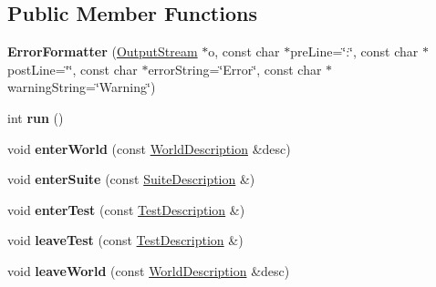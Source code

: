 \subsection*{Public Member Functions}
\begin{DoxyCompactItemize}
\item 
\hypertarget{classCxxTest_1_1ErrorFormatter_a9a6363f7a4b3aca6cdaeb6111826e7de}{{\bfseries Error\-Formatter} (\hyperlink{classCxxTest_1_1OutputStream}{Output\-Stream} $\ast$o, const char $\ast$pre\-Line=\char`\"{}\-:\char`\"{}, const char $\ast$post\-Line=\char`\"{}\char`\"{}, const char $\ast$error\-String=\char`\"{}Error\char`\"{}, const char $\ast$warning\-String=\char`\"{}Warning\char`\"{})}\label{classCxxTest_1_1ErrorFormatter_a9a6363f7a4b3aca6cdaeb6111826e7de}

\item 
\hypertarget{classCxxTest_1_1ErrorFormatter_a864e271c4a95907866d483a460aa5f71}{int {\bfseries run} ()}\label{classCxxTest_1_1ErrorFormatter_a864e271c4a95907866d483a460aa5f71}

\item 
\hypertarget{classCxxTest_1_1ErrorFormatter_aadd286f416ba8cf6df836863e7a44884}{void {\bfseries enter\-World} (const \hyperlink{classCxxTest_1_1WorldDescription}{World\-Description} \&desc)}\label{classCxxTest_1_1ErrorFormatter_aadd286f416ba8cf6df836863e7a44884}

\item 
\hypertarget{classCxxTest_1_1ErrorFormatter_a72d81800df02cedef86fa3bb7e6a736f}{void {\bfseries enter\-Suite} (const \hyperlink{classCxxTest_1_1SuiteDescription}{Suite\-Description} \&)}\label{classCxxTest_1_1ErrorFormatter_a72d81800df02cedef86fa3bb7e6a736f}

\item 
\hypertarget{classCxxTest_1_1ErrorFormatter_a4cf5c3068bcfe3478a02a16c5ab9dca3}{void {\bfseries enter\-Test} (const \hyperlink{classCxxTest_1_1TestDescription}{Test\-Description} \&)}\label{classCxxTest_1_1ErrorFormatter_a4cf5c3068bcfe3478a02a16c5ab9dca3}

\item 
\hypertarget{classCxxTest_1_1ErrorFormatter_a59d77ff2f2b8ff3715e7fb3938914dc5}{void {\bfseries leave\-Test} (const \hyperlink{classCxxTest_1_1TestDescription}{Test\-Description} \&)}\label{classCxxTest_1_1ErrorFormatter_a59d77ff2f2b8ff3715e7fb3938914dc5}

\item 
\hypertarget{classCxxTest_1_1ErrorFormatter_a68b02ba2222576fcdad50be38672b5c9}{void {\bfseries leave\-World} (const \hyperlink{classCxxTest_1_1WorldDescription}{World\-Description} \&desc)}\label{classCxxTest_1_1ErrorFormatter_a68b02ba2222576fcdad50be38672b5c9}


\end{DoxyCompactItemize}
